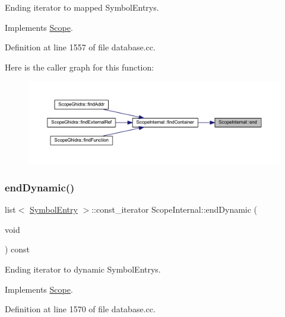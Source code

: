 Ending iterator to mapped Symbol\+Entrys. 



Implements \mbox{\hyperlink{class_scope_a186b8c11ebef0f2d3838bfe1e46b6db6}{Scope}}.



Definition at line 1557 of file database.\+cc.

Here is the caller graph for this function\+:
\nopagebreak
\begin{figure}[H]
\begin{center}
\leavevmode
\includegraphics[width=350pt]{class_scope_internal_a47df37673b1cea67ac1b4980037eafe0_icgraph}
\end{center}
\end{figure}
\mbox{\label{class_scope_internal_ad1690a1aacfecff51b6d5832cccafd95}} 
\subsubsection{\texorpdfstring{endDynamic()}{endDynamic()}\hspace{0.1cm}{\footnotesize\ttfamily [1/2]}}
{\footnotesize\ttfamily list$<$ \mbox{\hyperlink{class_symbol_entry}{Symbol\+Entry}} $>$\+::const\+\_\+iterator Scope\+Internal\+::end\+Dynamic (\begin{DoxyParamCaption}\item[{void}]{ }\end{DoxyParamCaption}) const\hspace{0.3cm}{\ttfamily [virtual]}}



Ending iterator to dynamic Symbol\+Entrys. 



Implements \mbox{\hyperlink{class_scope_add98c4a0c13d3497f82d0a5c2353b578}{Scope}}.



Definition at line 1570 of file database.\+cc.

